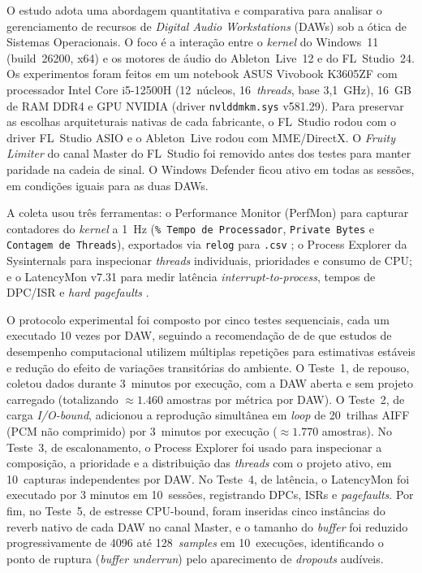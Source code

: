 \documentclass[tcc1]{classe_uftex/uftex}
\begin{document}
O estudo adota uma abordagem quantitativa e comparativa para analisar o
gerenciamento de recursos de \textit{Digital Audio Workstations} (DAWs)
sob a ótica de Sistemas Operacionais. O foco é a interação entre o
\textit{kernel} do Windows~11 (build~26200, x64) e os motores de áudio do
Ableton~Live~12 e do FL~Studio~24. Os experimentos foram feitos em um
notebook ASUS Vivobook K3605ZF com processador Intel Core i5-12500H
(12~núcleos, 16~\textit{threads}, base 3,1~GHz), 16~GB de RAM DDR4 e GPU
NVIDIA (driver \texttt{nvlddmkm.sys} v581.29). Para preservar as escolhas
arquiteturais nativas de cada fabricante, o FL~Studio rodou com o driver
FL~Studio ASIO e o Ableton~Live rodou com MME/DirectX. O \textit{Fruity
Limiter} do canal Master do FL~Studio foi removido antes dos testes para
manter paridade na cadeia de sinal. O Windows Defender ficou ativo em
todas as sessões, em condições iguais para as duas DAWs.

A coleta usou três ferramentas: o Performance Monitor (PerfMon) para
capturar contadores do \textit{kernel} a 1~Hz
(\texttt{\% Tempo de Processador}, \texttt{Private Bytes} e
\texttt{Contagem de Threads}), exportados via \texttt{relog} para
\texttt{.csv} \cite{microsoft2023perfmon}; o Process Explorer da
Sysinternals para inspecionar \textit{threads} individuais, prioridades
e consumo de CPU; e o LatencyMon v7.31 para medir latência
\textit{interrupt-to-process}, tempos de DPC/ISR e
\textit{hard pagefaults} \cite{asio4all}.

O protocolo experimental foi composto por cinco testes sequenciais,
cada um executado 10 vezes por DAW, seguindo a recomendação
de  de que estudos de desempenho computacional
utilizem múltiplas repetições para estimativas estáveis e redução do
efeito de variações transitórias do ambiente. O Teste~1, de repouso,
coletou dados durante 3~minutos por execução, com a DAW aberta e
sem projeto carregado (totalizando $\approx 1.460$ amostras por
métrica por DAW). O Teste~2, de carga \textit{I/O-bound}, adicionou
a reprodução simultânea em \textit{loop} de 20~trilhas AIFF (PCM não
comprimido) por 3~minutos por execução ($\approx 1.770$ amostras).
No Teste~3, de escalonamento, o Process Explorer foi usado para
inspecionar a composição, a prioridade e a distribuição das
\textit{threads} com o projeto ativo, em 10~capturas independentes
por DAW. No Teste~4, de latência, o LatencyMon foi executado por
3 minutos em 10~sessões, registrando DPCs, ISRs e
\textit{pagefaults}. Por fim, no Teste~5, de estresse CPU-bound,
foram inseridas cinco instâncias do reverb nativo de cada DAW no
canal Master, e o tamanho do \textit{buffer} foi reduzido
progressivamente de 4096 até 128~\textit{samples} em 10~execuções,
identificando o ponto de ruptura (\textit{buffer underrun}) pelo
aparecimento de \textit{dropouts} audíveis.
\end{document}
